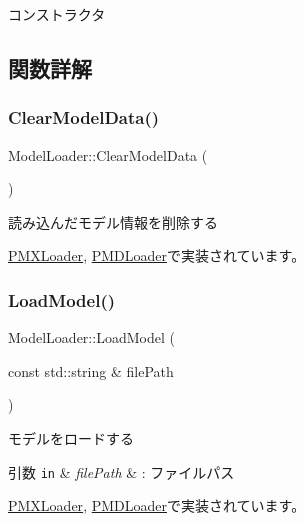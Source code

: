 コンストラクタ 



\subsection{関数詳解}
\mbox{\label{class_model_loader_a6662edd78b17eeead09e822e19fc1799}} 
\subsubsection{\texorpdfstring{Clear\+Model\+Data()}{ClearModelData()}}
{\footnotesize\ttfamily Model\+Loader\+::\+Clear\+Model\+Data (\begin{DoxyParamCaption}{ }\end{DoxyParamCaption})\hspace{0.3cm}{\ttfamily [pure virtual]}}

読み込んだモデル情報を削除する 

\mbox{\hyperlink{class_p_m_x_loader_a1c4f3f379e18d6978b7684ab9d901952}{P\+M\+X\+Loader}}, \mbox{\hyperlink{class_p_m_d_loader_abdb6e537aef759341dfc62cd1038539c}{P\+M\+D\+Loader}}で実装されています。

\mbox{\label{class_model_loader_a8e2157daa8d364c36fd26922f04adcb0}} 
\subsubsection{\texorpdfstring{Load\+Model()}{LoadModel()}}
{\footnotesize\ttfamily Model\+Loader\+::\+Load\+Model (\begin{DoxyParamCaption}\item[{const std\+::string \&}]{file\+Path }\end{DoxyParamCaption})\hspace{0.3cm}{\ttfamily [pure virtual]}}

モデルをロードする 
\begin{DoxyParams}[1]{引数}
\mbox{\tt in}  & {\em file\+Path} & \+: ファイルパス \\
\hline
\end{DoxyParams}


\mbox{\hyperlink{class_p_m_x_loader_aee4e81ab65eeec5c9772ed5a8de6c5fa}{P\+M\+X\+Loader}}, \mbox{\hyperlink{class_p_m_d_loader_ae1da98c6236a58940ec521521e5c8288}{P\+M\+D\+Loader}}で実装されています。



